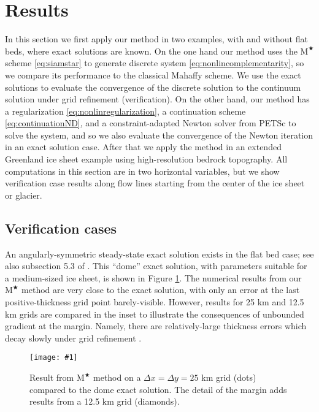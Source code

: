 \documentclass[twocolumn,letterpaper]{igs}
\newcommand{\onecol}[1]{\texttt{[image: \#1]}}
\newcommand{\Mstar}{$\text{M}^{\bigstar}$\xspace}
\begin{document}
\section{Results}

In this section we first apply our method in two examples, with and without flat beds, where exact solutions are known.  On the one hand our method uses the \Mstar scheme \eqref{eq:siamstar} to generate discrete system \eqref{eq:nonlincomplementarity}, so we compare its performance to the classical Mahaffy scheme.  We use the exact solutions to evaluate the convergence of the discrete solution to the continuum solution under grid refinement (verification).  On the other hand, our method has a regularization \eqref{eq:nonlinregularization}, a continuation scheme \eqref{eq:continuationND}, and a constraint-adapted Newton solver from PETSc to solve the system, and so we also evaluate the convergence of the Newton iteration in an exact solution case.  After that we apply the method in an extended Greenland ice sheet example using high-resolution bedrock topography.  All computations in this section are in two horizontal variables, but we show verification case results along flow lines starting from the center of the ice sheet or glacier.

\subsection{Verification cases}

An angularly-symmetric steady-state exact solution \citep{Bueler2003} exists in the flat bed case; see also subsection 5.3 of \cite{vanderVeen2013}.  This ``dome'' exact solution, with parameters suitable for a medium-sized ice sheet, is shown in Figure \ref{fig:domeprofile}.  The numerical results from our \Mstar method are very close to the exact solution, with only an error at the last positive-thickness grid point barely-visible.  However, results for 25 km and 12.5 km grids are compared in the inset to illustrate the consequences of unbounded gradient at the margin.  Namely, there are relatively-large thickness errors which decay slowly under grid refinement \citep{Bueleretal2005}.

\begin{figure}[ht]
\onecol{domeprofile.pdf}
\caption{Result from \Mstar method on a $\Delta x=\Delta y=25$ km grid (dots) compared to the dome exact solution.  The detail of the margin adds results from a 12.5 km grid  (diamonds).}
\label{fig:domeprofile}
\end{figure}
\end{document}
